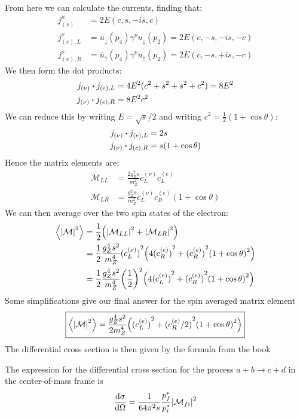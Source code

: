 \documentclass[12pt]{article}
\renewcommand{\bar}{\overline}
\newcommand{\M}{\mathcal{M}}
\newenvironment{thebook}
{\begin{mdframed}[style=defstyle,frametitle={From the Book}]}{\end{mdframed}}
\numberwithin{equation}{section}
\begin{document}
From here we can calculate the currents, finding that:
\begin{align*}
  j^\mu_{(\nu)}&=2E(c,s,-is,c)\\
  j^\nu_{(e),L}&=\bar{u}_\downarrow(p_4)\gamma^\nu u_\downarrow(p_2)
  =2E(c,-s,-is,-c)\\
  j^\nu_{(e),R}&=\bar{u}_\uparrow(p_4)\gamma^\nu u_\uparrow(p_2)
  =2E(c,-s,+is,-c)
\end{align*}
We then form the dot products:
\begin{align*}
  j_{(\nu)}\vdot j_{(e),L}
  &=4E^2(c^2+s^2+s^2+c^2)=8E^2\\
  j_{(\nu)}\vdot j_{(e),R}
  &=8E^2c^2
\end{align*}
We can reduce this by writing $E=\sqrt{s}/2$ and writing $c^2=\frac12(1+\cos\theta)$:
\begin{align*}
  j_{(\nu)}\vdot j_{(e),L}
  &=2s\\
  j_{(\nu)}\vdot j_{(e),R}
  &=s(1+\cos\theta)
\end{align*}
Hence the matrix elements are:
\begin{equation}
  \label{eq:t53}
  \boxed{
    \begin{aligned}
      \M_{LL}&=\frac{2g_Z^2s}{m_Z^2}c^{(\nu)}_L c^{(e)}_L\\
      \M_{LR}&=\frac{g_Z^2s}{m_Z^2}
      c_L^{(\nu)}c_R^{(e)}(1+\cos\theta)
    \end{aligned}
  }
\end{equation}
We can then average over the two spin states of the electron:
\begin{align*}
  \ev{\abs{\M}^2}&=\frac12
  \qty(\abs{\M_{LL}}^2+\abs{\M_{LR}}^2)\\
  &=\frac12\frac{g_Z^4s^2}{m_Z^4}{(c_L^{(\nu)})}^2
  \qty(4{(c_R^{(e)})}^2+{(c_R^{(e)})}^2{(1+\cos\theta)}^2)\\
  &=\frac12\frac{g_Z^4s^2}{m_Z^4}{\qty(\frac12)}^2
  \qty(4{(c_L^{(e)})}^2+{(c_R^{(e)})}^2{(1+\cos\theta)}^2)
\end{align*}
Some simplifications give our final answer for the spin averaged matrix element
\begin{equation}
  \label{eq:t54}
  \boxed{\ev{\abs{\M}^2}=\frac{g_Z^4s^2}{2m_Z^4}
  \qty({(c_L^{(e)})}^2+{(c_R^{(e)}/2)}^2{(1+\cos\theta)}^2)}
\end{equation}
The differential cross section is then given by the formula from the book
\begin{thebook}
  The expression for the differential cross section for the process $a+b\to c+d$ in the center-of-mass frame is
  \begin{align*}
    \dv{\sigma}{\Omega}=\frac1{64\pi^2s}\frac{p_f^*}{p_i^*}\abs{\M_{fi}}^2
  \end{align*}
\end{thebook}
\end{document}
